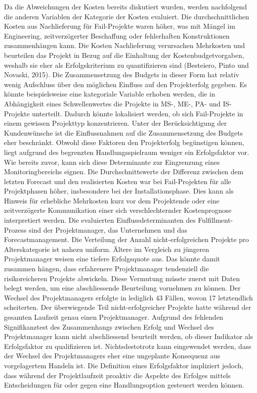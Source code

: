 \newline\newline
Da die Abweichungen der Kosten bereits diskutiert wurden, werden nachfolgend die anderen Variablen der Kategorie der Kosten evaluiert. Die durchschnittlichen Kosten aus Nachlieferung für Fail-Projekte waren höher, was mit Mängel im Engineering, zeitverzögerter Beschaffung oder fehlerhaften Konstruktionen zusammenhängen kann. Die Kosten Nachlieferung verursachen Mehrkosten und beurteilen das Projekt in Bezug auf die Einhaltung der Kostenbudgetvorgaben, weshalb sie eher als Erfolgskriterium zu quantifizieren sind (Besteiero, Pinto und Novaski, 2015). Die Zusammensetzung des Budgets in dieser Form hat relativ wenig Aufschluss über den möglichen Einfluss auf den Projekterfolg gegeben. Es könnte beispielsweise eine kategoriale Variable erhoben werden, die in Abhängigkeit eines Schwellenwertes die Projekte in MS-, ME-, PA- und IS-Projekte unterteilt. Dadurch könnte lokalisiert werden, ob sich Fail-Projekte in einem gewissen Projekttyp konzentrieren. Unter der Berücksichtigung der Kundenwünsche ist die Einflussnahmen auf die Zusammensetzung des Budgets eher beschränkt. Obwohl diese Faktoren den Projekterfolg begünstigen können, liegt aufgrund des begrenzten Handlungsspielraum weniger ein Erfolgsfaktor vor. Wie bereits zuvor, kann sich diese Determinante zur Eingrenzung eines Monitoringbereichs eignen. Die Durchschnittswerte der Differenz zwischen dem letzten Forecast und den realisierten Kosten war bei Fail-Projekten für alle Projektphasen höher, insbesondere bei der Installationsphase. Dies kann als Hinweis für erhebliche Mehrkosten kurz vor dem Projektende oder eine zeitverzögerte Kommunikation einer sich verschlechternder Kostenprognose interpretiert werden. 
\newline\newline
Die evaluierten Einflussdeterminanten des Fulfillment-Prozess sind der Projektmanager, das Unternehmen und das Forecastmanagement. Die Verteilung der Anzahl nicht-erfolgreichen Projekte pro Alterskategorie ist nahezu uniform. Ältere im Vergleich zu jüngeren Projektmanager weisen eine tiefere Erfolgsquote aus. Das könnte damit zusammen hängen, dass erfahrenere Projektmanager tendenziell die risikoreicheren Projekte abwickeln. Diese Vermutung müsste zuerst mit Daten belegt werden, um eine abschliessende Beurteilung vornehmen zu können. Der Wechsel des Projektmanagers erfolgte in lediglich 43 Fällen, wovon 17 letztendlich scheiterten. Der überwiegende Teil nicht-erfolgreicher Projekte hatte während der gesamten Laufzeit genau einen Projektmanager. Aufgrund des fehlenden Signifikanztest des Zusammenhangs zwischen Erfolg und Wechsel des Projektmanager kann nicht abschliessend beurteilt werden, ob dieser Indikator als Erfolgsfaktor zu qualifizieren ist. Nichtsdestotrotz kann eingewendet werden, dass der Wechsel des Projektmanagers eher eine ungeplante Konsequenz aus vorgelagertem Handeln ist. Die Definition eines Erfolgsfaktor impliziert jedoch, dass während der Projektlaufzeit proaktiv die Aspekte des Erfolges mittels Entscheidungen für oder gegen eine Handlungsoption gesteuert werden können.
